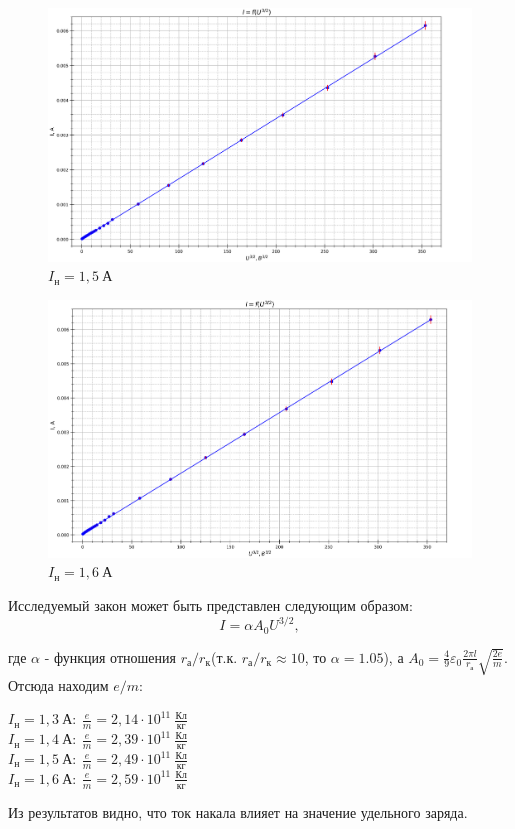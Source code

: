 \documentclass[a4paper,12pt]{article}
\begin{document}
\begin{figure}[!h]
\centering
\includegraphics[width=0.9\linewidth]{I=1,5.png}
\caption{$I_{н}=1,5~А$}
\label{fig:mpr}
\end{figure}

\begin{figure}[!h]
\centering
\includegraphics[width=0.9\linewidth]{I=1,6.png}
\caption{$I_{н}=1,6~А$}
\label{fig:mpr}
\end{figure}

Исследуемый закон может быть представлен следующим образом:
\begin{equation}
    I=\alpha A_0 U^{3/2},
\end{equation}

где $\alpha$ - функция отношения $r_{а}/r_{к}$(т.к. $r_{а}/r_{к}\approx 10$, то $\alpha = 1.05$), а $A_0 = \frac{4}{9}\varepsilon_0 \frac{2\pi l}{r_{а}}\sqrt{\frac{2e}{m}}$. 
\newpage
Отсюда находим $e/m$:
\begin{center}
    $I_{н}=1,3~А:~\frac{e}{m}=2,14\cdot 10^{11}~\frac{Кл}{кг}$\\ 
    $I_{н}=1,4~А:~\frac{e}{m}=2,39\cdot 10^{11}~\frac{Кл}{кг}$\\
    $I_{н}=1,5~А:~\frac{e}{m}=2,49\cdot 10^{11}~\frac{Кл}{кг}$\\
    $I_{н}=1,6~А:~\frac{e}{m}=2,59\cdot 10^{11}~\frac{Кл}{кг}$\\
\end{center}
Из результатов видно, что ток накала влияет на значение удельного заряда.
\end{document}
